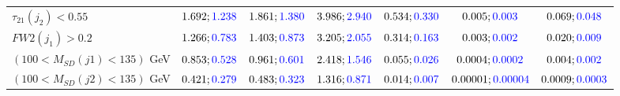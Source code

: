 \begin{landscape}
\begin{table}
\begin{tabular}{lcccccc}
				\rowcolor{black!7}$\tau_{21}(j_2)<0.55$ &$1.692;\textcolor{blue}{1.238}$ &$1.861;\textcolor{blue}{1.380}$ &$3.986;\textcolor{blue}{2.940}$&$0.534;\textcolor{blue}{0.330}$&$0.005;\textcolor{blue}{0.003}$&$0.069;\textcolor{blue}{0.048}$\\
				$FW2(j_1)>0.2$ &$1.266;\textcolor{blue}{0.783}$ &$1.403;\textcolor{blue}{0.873}$&$3.205;\textcolor{blue}{2.055}$&$0.314;\textcolor{blue}{0.163}$&$0.003;\textcolor{blue}{0.002}$&$0.020;\textcolor{blue}{0.009}$\\
				\rowcolor{black!7}$(100<M_{SD}(j1)<135)$ GeV& $0.853;\textcolor{blue}{0.528}$&$0.961;\textcolor{blue}{0.601}$&$2.418;\textcolor{blue}{1.546}$&$0.055;\textcolor{blue}{0.026}$&$0.0004;\textcolor{blue}{0.0002}$&$0.004;\textcolor{blue}{0.002}$\\
				$(100<M_{SD}(j2)<135)$ GeV &$0.421;\textcolor{blue}{0.279}$ &$0.483;\textcolor{blue}{0.323}$ &$1.316;\textcolor{blue}{0.871}$&$0.014;\textcolor{blue}{0.007}$&$0.00001;\textcolor{blue}{0.00004}$&$0.0009;\textcolor{blue}{0.0003}$\\
				\bottomrule
			\end{tabular}
		\end{table}


\end{landscape}
